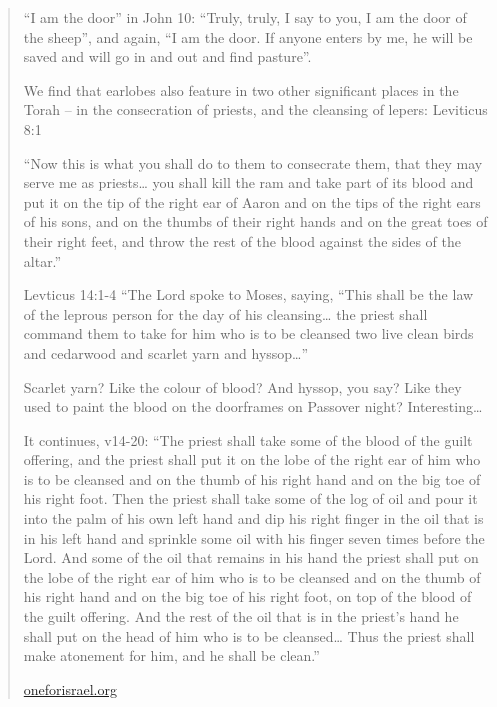 \documentclass[11pt]{article}
\begin{document}
\begin{quote}
“I am the door” in John 10: “Truly, truly, I say to you, I am the door of the sheep”, and again, “I am the door. If anyone enters by me, he will be saved and will go in and out and find pasture”.

We find that earlobes also feature in two other significant places in the Torah – in the consecration of priests, and the cleansing of lepers: Leviticus 8:1

“Now this is what you shall do to them to consecrate them, that they may serve me as priests… you shall kill the ram and take part of its blood and put it on the tip of the right ear of Aaron and on the tips of the right ears of his sons, and on the thumbs of their right hands and on the great toes of their right feet, and throw the rest of the blood against the sides of the altar.”

Levticus 14:1-4 “The Lord spoke to Moses, saying, “This shall be the law of the leprous person for the day of his cleansing… the priest shall command them to take for him who is to be cleansed two live clean birds and cedarwood and scarlet yarn and hyssop…”

Scarlet yarn? Like the colour of blood? And hyssop, you say? Like they used to paint the blood on the doorframes on Passover night? Interesting…

It continues, v14-20: “The priest shall take some of the blood of the guilt offering, and the priest shall put it on the lobe of the right ear of him who is to be cleansed and on the thumb of his right hand and on the big toe of his right foot. Then the priest shall take some of the log of oil and pour it into the palm of his own left hand and dip his right finger in the oil that is in his left hand and sprinkle some oil with his finger seven times before the Lord. And some of the oil that remains in his hand the priest shall put on the lobe of the right ear of him who is to be cleansed and on the thumb of his right hand and on the big toe of his right foot, on top of the blood of the guilt offering. And the rest of the oil that is in the priest’s hand he shall put on the head of him who is to be cleansed… Thus the priest shall make atonement for him, and he shall be clean.”

\url{oneforisrael.org}
\end{quote}
\end{document}
